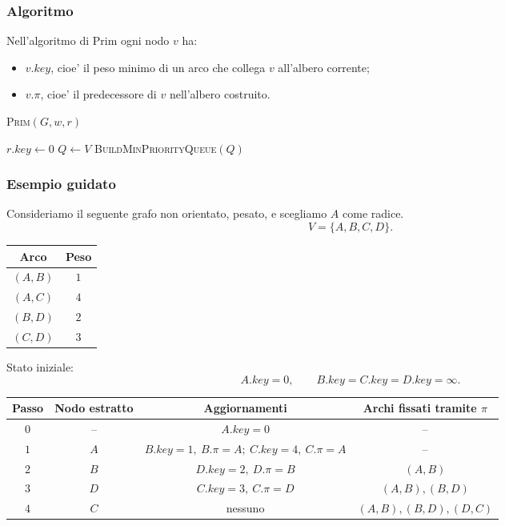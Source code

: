 \subsubsection{Algoritmo}
Nell'algoritmo di Prim ogni nodo $v$ ha:
\begin{itemize}
	\item $v.key$, cioe' il peso minimo di un arco che collega $v$ all'albero corrente;
	\item $v.\pi$, cioe' il predecessore di $v$ nell'albero costruito.
\end{itemize}

\begin{algorithm}[H]
	\caption{\textsc{Prim}$(G,w,r)$}
	$r.key\gets 0$\;
	$Q\gets V$\;
	\textsc{BuildMinPriorityQueue}$(Q)$
\end{algorithm}

\subsubsection{Esempio guidato}
Consideriamo il seguente grafo non orientato, pesato, e scegliamo $A$ come radice.
\[
V=\{A,B,C,D\}.
\]

\begin{center}
\begin{tabular}{c|c}
Arco & Peso \\
\hline
$(A,B)$ & $1$ \\
$(A,C)$ & $4$ \\
$(B,D)$ & $2$ \\
$(C,D)$ & $3$
\end{tabular}
\end{center}

Stato iniziale:
\[
A.key=0,\qquad B.key=C.key=D.key=\infty.
\]

\begin{center}
\begin{tabular}{c|c|c|c}
Passo & Nodo estratto & Aggiornamenti & Archi fissati tramite $\pi$ \\
\hline
$0$ & -- & $A.key=0$ & -- \\
$1$ & $A$ & $B.key=1,\ B.\pi=A;\ C.key=4,\ C.\pi=A$ & -- \\
$2$ & $B$ & $D.key=2,\ D.\pi=B$ & $(A,B)$ \\
$3$ & $D$ & $C.key=3,\ C.\pi=D$ & $(A,B),(B,D)$ \\
$4$ & $C$ & nessuno & $(A,B),(B,D),(D,C)$
\end{tabular}
\end{center}

